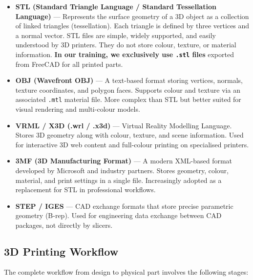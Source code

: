 \documentclass[12pt, a4paper]{article}
\begin{document}
\begin{itemize}[itemsep=4pt]
  \item \textbf{STL (Standard Triangle Language / Standard Tessellation
  Language)} --- Represents the surface geometry of a 3D object as a collection
  of linked triangles (tessellation). Each triangle is defined by three vertices
  and a normal vector. STL files are simple, widely supported, and easily
  understood by 3D printers. They do not store colour, texture, or material
  information. \textbf{In our training, we exclusively use \texttt{.stl} files}
  exported from FreeCAD for all printed parts.

  \item \textbf{OBJ (Wavefront OBJ)} --- A text-based format storing vertices,
  normals, texture coordinates, and polygon faces. Supports colour and texture
  via an associated \texttt{.mtl} material file. More complex than STL but
  better suited for visual rendering and multi-colour models.

  \item \textbf{VRML / X3D (.wrl / .x3d)} --- Virtual Reality Modelling
  Language. Stores 3D geometry along with colour, texture, and scene
  information. Used for interactive 3D web content and full-colour printing on
  specialised printers.

  \item \textbf{3MF (3D Manufacturing Format)} --- A modern XML-based format
  developed by Microsoft and industry partners. Stores geometry, colour,
  material, and print settings in a single file. Increasingly adopted as a
  replacement for STL in professional workflows.

  \item \textbf{STEP / IGES} --- CAD exchange formats that store precise
  parametric geometry (B-rep). Used for engineering data exchange between CAD
  packages, not directly by slicers.
\end{itemize}

\subsection{3D Printing Workflow}

The complete workflow from design to physical part involves the following stages:
\end{document}
